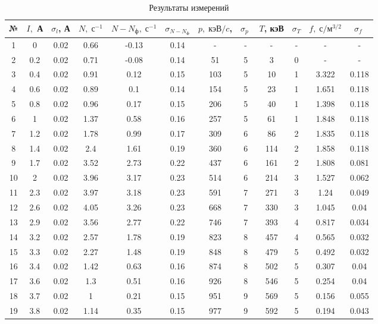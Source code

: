 \documentclass[12pt]{kiarticle} %
\begin{document}
	\begin{table}[h!]
		\caption{Результаты измерений}
		\begin{center}
			\begin{tabular}{|c|c|c|c|c|c|c|c|c|c|c|c|}
				\hline
				№ & $ I, $ А & $ \sigma_l $, А & $ N, \; с^{-1} $ & $ N - N_ф,  \; с^{-1} $ & $ \sigma_{N-N_ф}$  & $ p, \; кэВ/c $,  & $ \sigma_p \;  $  & $ T $, кэВ & $ \sigma_T $ & $ f, \; с/м^{3/2 } $& $ \sigma_f \;$\\
				\hline
	1 & 0 & 0.02 & 0.66 & -0.13 & 0.14 & - & - & - & - & - &- \\
	2 & 0.2 & 0.02 & 0.71 & -0.08 & 0.14 & 51 & 5 & 3 & 0 & - & - \\
	3 & 0.4 & 0.02 & 0.91 & 0.12 & 0.15 & 103 & 5 & 10 & 1 & 3.322 & 0.118 \\
	4 & 0.6 & 0.02 & 0.89 & 0.1 & 0.14 & 154 & 5 & 23 & 1 & 1.651 & 0.118 \\
	5 & 0.8 & 0.02 & 0.96 & 0.17 & 0.15 & 206 & 5 & 40 & 1 & 1.398 & 0.118 \\
	6 & 1 & 0.02 & 1.37 & 0.58 & 0.16 & 257 & 5 & 61 & 1 & 1.848 & 0.118 \\
	7 & 1.2 & 0.02 & 1.78 & 0.99 & 0.17 & 309 & 6 & 86 & 2 & 1.835 & 0.118 \\
	8 & 1.4 & 0.02 & 2.4 & 1.61 & 0.19 & 360 & 6 & 114 & 2 & 1.858 & 0.118 \\
	9 & 1.7 & 0.02 & 3.52 & 2.73 & 0.22 & 437 & 6 & 161 & 2 & 1.808 & 0.081 \\
	10 & 2 & 0.02 & 3.96 & 3.17 & 0.23 & 514 & 6 & 214 & 3 & 1.527 & 0.062 \\
	11 & 2.3 & 0.02 & 3.97 & 3.18 & 0.23 & 591 & 7 & 271 & 3 & 1.24 & 0.049 \\
	12 & 2.6 & 0.02 & 4.05 & 3.26 & 0.23 & 668 & 7 & 330 & 3 & 1.045 & 0.04 \\
	13 & 2.9 & 0.02 & 3.56 & 2.77 & 0.22 & 746 & 7 & 393 & 4 & 0.817 & 0.034 \\
	14 & 3.2 & 0.02 & 2.57 & 1.78 & 0.19 & 823 & 8 & 457 & 4 & 0.565 & 0.032 \\
	15 & 3.3 & 0.02 & 2.27 & 1.48 & 0.19 & 848 & 8 & 479 & 5 & 0.492 & 0.032 \\
	16 & 3.4 & 0.02 & 1.42 & 0.63 & 0.16 & 874 & 8 & 502 & 5 & 0.307 & 0.04 \\
	17 & 3.6 & 0.02 & 1.3 & 0.51 & 0.16 & 926 & 8 & 546 & 5 & 0.254 & 0.04 \\
	18 & 3.7 & 0.02 & 1 & 0.21 & 0.15 & 951 & 9 & 569 & 5 & 0.156 & 0.055 \\
	19 & 3.8 & 0.02 & 1.14 & 0.35 & 0.15 & 977 & 9 & 592 & 5 & 0.194 & 0.043 \\

\end{tabular}
\end{center}
\end{table}
\end{document}
